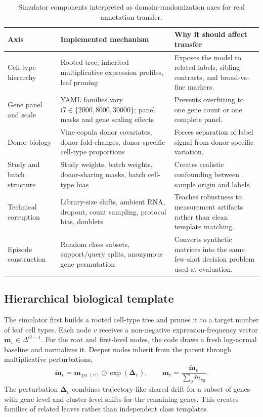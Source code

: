 \documentclass{article}
\begin{document}
\begin{table}[t]
\centering
\small
\setlength{\tabcolsep}{4pt}
\caption{Simulator components interpreted as domain-randomization axes for real annotation transfer.}
\label{tab:domain_randomization}
\begin{tabularx}{\textwidth}{@{}p{}p{}X@{}}
\toprule
\textbf{Axis} & \textbf{Implemented mechanism} & \textbf{Why it should affect transfer} \\
\midrule
Cell-type hierarchy & Rooted tree, inherited multiplicative expression profiles, leaf pruning & Exposes the model to related labels, sibling contrasts, and broad-vs-fine markers. \\
Gene panel and scale & YAML families vary \(G\in\{2000,8000,30000\}\); panel masks and gene scaling effects & Prevents overfitting to one gene count or one complete panel. \\
Donor biology & Vine-copula donor covariates, donor fold-changes, donor-specific cell-type proportions & Forces separation of label signal from donor-specific variation. \\
Study and batch structure & Study weights, batch weights, donor-sharing masks, batch cell-type bias & Creates realistic confounding between sample origin and labels. \\
Technical corruption & Library-size shifts, ambient RNA, dropout, count sampling, protocol bias, doublets & Teaches robustness to measurement artifacts rather than clean template matching. \\
Episode construction & Random class subsets, support/query splits, anonymous gene permutation & Converts synthetic matrices into the same few-shot decision problem used at evaluation. \\
\bottomrule
\end{tabularx}
\end{table}

\subsection{Hierarchical biological template}

The simulator first builds a rooted cell-type tree and prunes it to a target number of leaf cell types. Each node \(v\) receives a non-negative expression-frequency vector \(\mathbf{m}_v\in\Delta^{G-1}\). For the root and first-level nodes, the code draws a fresh log-normal baseline and normalizes it. Deeper nodes inherit from the parent through multiplicative perturbations,
\begin{equation}
    \tilde{\mathbf{m}}_v = \mathbf{m}_{\operatorname{pa}(v)}\odot\exp(\boldsymbol{\Delta}_v),
    \qquad
    \mathbf{m}_v = \frac{\tilde{\mathbf{m}}_v}{\sum_g \tilde{m}_{vg}}.
\end{equation}
The perturbation \(\boldsymbol{\Delta}_v\) combines trajectory-like shared drift for a subset of genes with gene-level and cluster-level shifts for the remaining genes. This creates families of related leaves rather than independent class templates.
\end{document}
